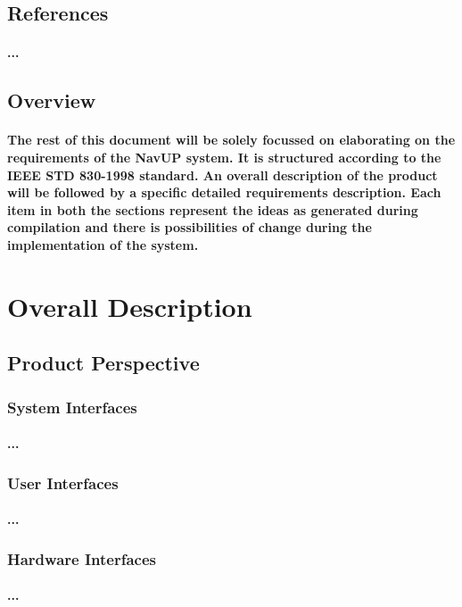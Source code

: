 \documentclass[runningheads,a4paper]{llncs}
\begin{document}
\subsection{References}
\paragraph{...}
\subsection{Overview}
\paragraph*{The rest of this document will be solely focussed on elaborating on the requirements of the NavUP system. It is structured according to the IEEE STD 830-1998 standard. An overall description of the product will be followed by a specific detailed requirements description. Each item in both the sections represent the ideas as generated during compilation and there is possibilities of change during the implementation of the system.}

\section{Overall Description}

\subsection{Product Perspective}

\subsubsection{System Interfaces}
\paragraph{...}
\subsubsection{User Interfaces}
\paragraph{...}
\subsubsection{Hardware Interfaces}
\paragraph{...}
\end{document}
